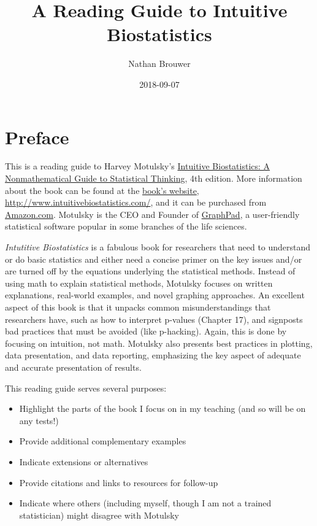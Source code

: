 \documentclass[]{book}
\title{A Reading Guide to Intuitive Biostatistics}
\author{Nathan Brouwer}
\date{2018-09-07}
\providecommand{\tightlist}{%
  \setlength{\itemsep}{0pt}\setlength{\parskip}{0pt}}
\theoremstyle{definition}
\theoremstyle{definition}
\theoremstyle{definition}
\theoremstyle{remark}
\begin{document}
\maketitle

{
\setcounter{tocdepth}{1}
\tableofcontents
}
\chapter*{Preface}\label{preface}

This is a reading guide to Harvey Motulsky's
\href{http://www.intuitivebiostatistics.com/}{Intuitive Biostatistics: A
Nonmathematical Guide to Statistical Thinking}, 4th edition. More
information about the book can be found at the
\href{http://www.intuitivebiostatistics.com/}{book's website},
\url{http://www.intuitivebiostatistics.com/}, and it can be purchased
from
\href{https://www.amazon.com/Intuitive-Biostatistics-Nonmathematical-Statistical-Thinking/dp/0190643560/ref=asap_bc?ie=UTF8}{Amazon.com}.
Motulsky is the CEO and Founder of
\href{https://www.graphpad.com/}{GraphPad}, a user-friendly statistical
software popular in some branches of the life sciences.

\emph{Intutitive Biostatistics} is a fabulous book for researchers that
need to understand or do basic statistics and either need a concise
primer on the key issues and/or are turned off by the equations
underlying the statistical methods. Instead of using math to explain
statistical methods, Motulsky focuses on written explanations,
real-world examples, and novel graphing approaches. An excellent aspect
of this book is that it unpacks common misunderstandings that
researchers have, such as how to interpret p-values (Chapter 17), and
signposts bad practices that must be avoided (like p-hacking). Again,
this is done by focusing on intuition, not math. Motulsky also presents
best practices in plotting, data presentation, and data reporting,
emphasizing the key aspect of adequate and accurate presentation of
results.

This reading guide serves several purposes:

\begin{itemize}
\tightlist
\item
  Highlight the parts of the book I focus on in my teaching (and so will
  be on any tests!)
\item
  Provide additional complementary examples
\item
  Indicate extensions or alternatives
\item
  Provide citations and links to resources for follow-up
\item
  Indicate where others (including myself, though I am not a trained
  statistician) might disagree with Motulsky
\end{itemize}
\end{document}
